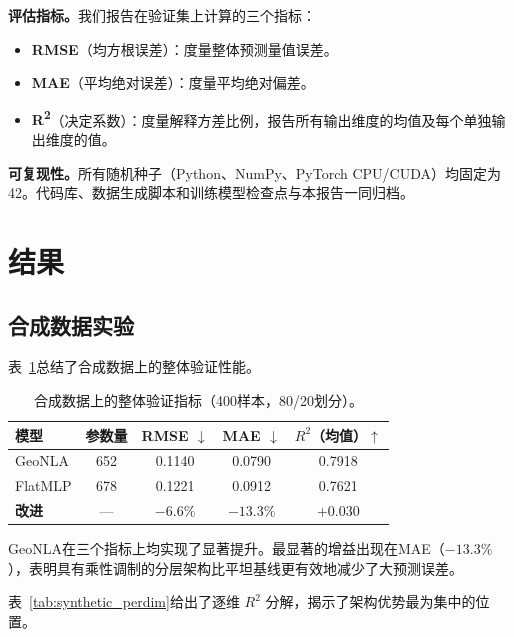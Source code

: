 \documentclass[a4paper,11pt]{article}
\begin{document}
\textbf{评估指标。}我们报告在验证集上计算的三个指标：

\begin{itemize}
    \item \textbf{RMSE}（均方根误差）：度量整体预测量值误差。
    \item \textbf{MAE}（平均绝对误差）：度量平均绝对偏差。
    \item \textbf{R\textsuperscript{2}}（决定系数）：度量解释方差比例，报告所有输出维度的均值及每个单独输出维度的值。
\end{itemize}

\textbf{可复现性。}所有随机种子（Python、NumPy、PyTorch CPU/CUDA）均固定为42。代码库、数据生成脚本和训练模型检查点与本报告一同归档。

\section{结果}
\label{sec:results}

\subsection{合成数据实验}
\label{subsec:synthetic_results}

表~\ref{tab:synthetic_overall}总结了合成数据上的整体验证性能。

\begin{table}[htbp]
\centering
\caption{合成数据上的整体验证指标（400样本，80/20划分）。}
\label{tab:synthetic_overall}
\begin{tabular}{lcccc}
\toprule
模型 & 参数量 & RMSE $\downarrow$ & MAE $\downarrow$ & $R^2$（均值）$\uparrow$ \\
\midrule
GeoNLA & 652 & 0.1140 & 0.0790 & 0.7918 \\
FlatMLP & 678 & 0.1221 & 0.0912 & 0.7621 \\
\textbf{改进} & --- & \textbf{$-6.6\%$} & \textbf{$-13.3\%$} & \textbf{$+0.030$} \\
\bottomrule
\end{tabular}
\end{table}

GeoNLA在三个指标上均实现了显著提升。最显著的增益出现在MAE（$-13.3\%$），表明具有乘性调制的分层架构比平坦基线更有效地减少了大预测误差。

表~\ref{tab:synthetic_perdim}给出了逐维 $R^2$ 分解，揭示了架构优势最为集中的位置。
\end{document}
